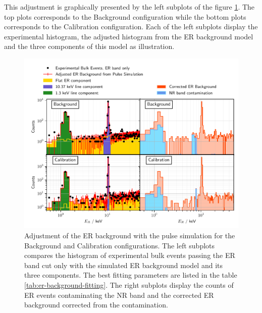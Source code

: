 This adjustment is graphically presented by the left subplots of the figure \ref{fig:neutron-contamination}. The top plots corresponds to the Background configuration while the bottom plots corresponds to the Calibration configuration. Each of the left subplots display the experimental histogram, the adjusted histogram from the ER background model and the three components of this model as illustration. 

\begin{figure}
\centering
\includegraphics[scale=1]{Figures/Neutron/neutron_contamination.pdf}
\caption{Adjustment of the ER background with the pulse simulation for the Background and Calibration configurations. The left subplots compares the histogram of experimental bulk events passing the ER band cut only with the simulated ER background model and its three components. The best fitting parameters are listed in the table \ref{tab:er-background-fitting}. The right subplots display the counts of ER events contaminating the NR band and the corrected ER background corrected from the contamination. }
\label{fig:neutron-contamination}
\end{figure}

